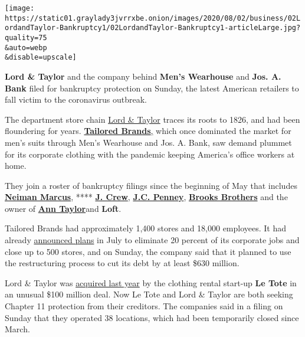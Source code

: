 \texttt{[image: https://static01.graylady3jvrrxbe.onion/images/2020/08/02/business/02LordandTaylor-Bankruptcy1/02LordandTaylor-Bankruptcy1-articleLarge.jpg?quality=75\\\&auto=webp\\\&disable=upscale]}

\textbf{Lord \& Taylor} and the company behind \textbf{Men's Wearhouse}
and \textbf{Jos. A. Bank} filed for bankruptcy protection on Sunday, the
latest American retailers to fall victim to the coronavirus outbreak.

The department store chain
\href{https://www.nytimes3xbfgragh.onion/2020/08/02/business/Lord-and-Taylor-Bankruptcy.html}{Lord
\& Taylor} traces its roots to 1826, and had been floundering for years.
\textbf{\href{https://www.nytimes3xbfgragh.onion/2020/08/03/business/tailored-brands-mens-wearhouse-bankruptcy.html}{Tailored
Brands}}\href{https://www.nytimes3xbfgragh.onion/2020/08/03/business/tailored-brands-mens-wearhouse-bankruptcy.html}{,}
which once dominated the market for men's suits through Men's Wearhouse
and Jos. A. Bank, saw demand plummet for its corporate clothing with the
pandemic keeping America's office workers at home.

They join a roster of bankruptcy filings since the beginning of May that
includes
\textbf{\href{https://www.nytimes3xbfgragh.onion/2020/05/07/business/neiman-marcus-bankruptcy.html}{Neiman
Marcus}}, ****
\textbf{\href{https://www.nytimes3xbfgragh.onion/2020/05/03/business/j-crew-bankruptcy-coronavirus.html}{J.
Crew}},
\textbf{\href{https://www.nytimes3xbfgragh.onion/2020/05/15/business/jc-penney-bankruptcy-coronavirus.html}{J.C.
Penney}},
\textbf{\href{https://www.nytimes3xbfgragh.onion/2020/07/08/business/brooks-brothers-chapter-11-bankruptcy.html}{Brooks
Brothers}} and the owner of
\textbf{\href{https://www.nytimes3xbfgragh.onion/2020/07/23/business/ascena-bankruptcy-ann-taylor-lane-bryant.html}{Ann
Taylor}}\href{https://www.nytimes3xbfgragh.onion/2020/07/23/business/ascena-bankruptcy-ann-taylor-lane-bryant.html}{}and
\textbf{Loft}.

Tailored Brands had approximately 1,400 stores and 18,000 employees. It
had already
\href{https://www.businesswire.com/news/home/20200721005319/en/Tailored-Brands-Announces-Plans-Reduce-Headcount-Close}{announced
plans} in July to eliminate 20 percent of its corporate jobs and close
up to 500 stores, and on Sunday, the company said that it planned to use
the restructuring process to cut its debt by at least \$630 million.

Lord \& Taylor was
\href{https://www.nytimes3xbfgragh.onion/2019/08/28/business/lord-taylor-sold-le-tote.html}{acquired
last year} by the clothing rental start-up \textbf{Le Tote} in an
unusual \$100 million deal. Now Le Tote and Lord \& Taylor are both
seeking Chapter 11 protection from their creditors. The companies said
in a filing on Sunday that they operated 38 locations, which had been
temporarily closed since March.

